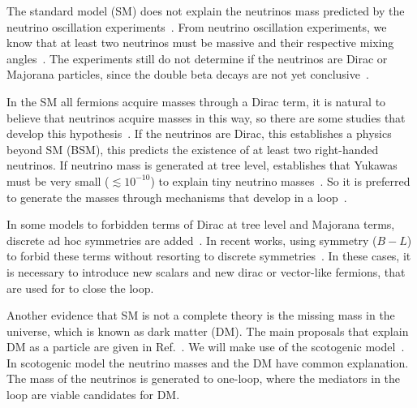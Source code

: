 \documentclass[12pt]{article}
\begin{document}



The standard model (SM) does not explain the neutrinos mass predicted by the neutrino oscillation experiments~\cite{Ahmad:2002jz, Fukuda:1998mi}. From neutrino oscillation experiments, we know that at least two neutrinos must be massive and their respective mixing angles~\cite{deSalas:2017kay}. The experiments still do not determine if the neutrinos are Dirac or Majorana particles, since the double beta decays are not yet conclusive~\cite{Arnold:2016bed, Albert:2017owj, Alduino:2017ehq, Aalseth:2017btx, Agostini:2018tnm, KamLAND-Zen:2016pfg}.

In the SM all fermions acquire masses through a Dirac term, it is natural to believe that neutrinos acquire masses in this way, so there are some studies that develop this hypothesis~\cite{Branco:1978bz}. If the neutrinos are  Dirac, this establishes a physics beyond SM (BSM), this predicts the existence of at least two right-handed neutrinos. If neutrino mass is generated at tree level, establishes that Yukawas must be very small ($\lesssim 10^{-10}$) to explain tiny neutrino masses~\cite{deSalas:2017kay}. So it is preferred to generate the masses through mechanisms that develop in a loop~\cite{Branco:1978bz, Zee:1980ai, Ma:2006km}.

In some models to forbidden terms of Dirac at tree level and Majorana terms, discrete ad hoc symmetries are added~\cite{Han:2018zcn, Wang:2017mcy}. In recent works, using symmetry ($B-L$) to forbid these terms without resorting to discrete symmetries~\cite{Calle:2018ovc, Bonilla:2018ynb, Saad:2019bqf}. In these cases, it is necessary to introduce new scalars and new dirac or vector-like fermions, that are used for to close the loop.

Another evidence that SM is not a complete theory is the missing mass in the universe, which is known as dark matter (DM). The main proposals that explain DM as a particle are given in Ref.~\cite{Bertone:2004pz}. We will make use of the scotogenic model~\cite{Ma:2006km}. In scotogenic model the neutrino masses and the DM have common explanation. The mass of the neutrinos is generated to one-loop, where the mediators in the loop are viable candidates for DM.
\end{document}
